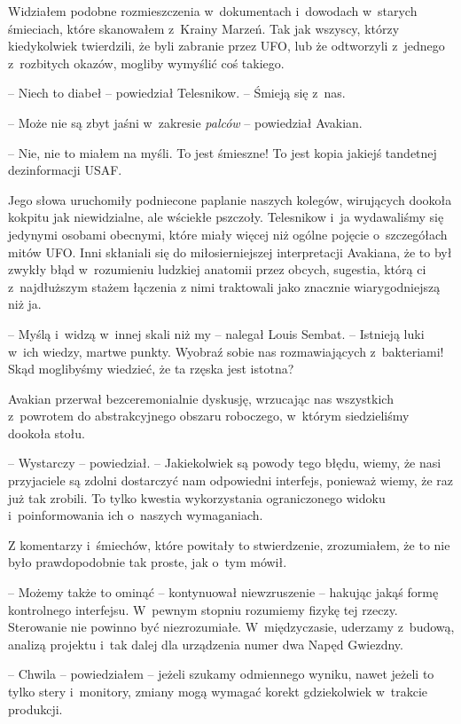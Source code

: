 \documentclass[oneside,polish,12pt,sfheadings]{mwbk}
\begin{document}
Widziałem podobne rozmieszczenia w~dokumentach i~dowodach w~starych
śmieciach, które skanowałem z~Krainy Marzeń. Tak jak wszyscy, którzy
kiedykolwiek twierdzili, że byli zabranie przez UFO, lub że odtworzyli z~jednego z~rozbitych okazów, mogliby wymyślić coś takiego.

-- Niech to diabeł -- powiedział Telesnikow. -- Śmieją się z~nas.

-- Może nie są zbyt jaśni w~zakresie \emph{palców} -- powiedział Avakian.

-- Nie, nie to miałem na myśli. To jest śmieszne! To jest kopia jakiejś
tandetnej dezinformacji USAF.

Jego słowa uruchomiły podniecone paplanie naszych kolegów, wirujących
dookoła kokpitu jak niewidzialne, ale wściekłe pszczoły. Telesnikow i~ja
wydawaliśmy się jedynymi osobami obecnymi, które miały więcej niż ogólne
pojęcie o~szczegółach mitów UFO. Inni skłaniali się do miłosierniejszej
interpretacji Avakiana, że to był zwykły błąd w~rozumieniu ludzkiej
anatomii przez obcych, sugestia, którą ci z~najdłuższym stażem łączenia
z nimi traktowali jako znacznie wiarygodniejszą niż ja.

-- Myślą i~widzą w~innej skali niż my -- nalegał Louis Sembat. -- Istnieją
luki w~ich wiedzy, martwe punkty. Wyobraź sobie nas rozmawiających z~bakteriami! Skąd moglibyśmy wiedzieć, że ta rzęska jest istotna?

Avakian przerwał bezceremonialnie dyskusję, wrzucając nas wszystkich z~powrotem do abstrakcyjnego obszaru roboczego, w~którym siedzieliśmy
dookoła stołu.

-- Wystarczy -- powiedział. -- Jakiekolwiek są powody tego błędu, wiemy, że
nasi przyjaciele są zdolni dostarczyć nam odpowiedni interfejs, ponieważ
wiemy, że raz już tak zrobili. To tylko kwestia wykorzystania
ograniczonego widoku i~poinformowania ich o~naszych wymaganiach.

Z komentarzy i~śmiechów, które powitały to stwierdzenie, zrozumiałem, że
to nie było prawdopodobnie tak proste, jak o~tym mówił.

-- Możemy także to ominąć -- kontynuował niewzruszenie -- hakując jakąś
formę kontrolnego interfejsu. W~pewnym stopniu rozumiemy fizykę tej
rzeczy. Sterowanie nie powinno być niezrozumiałe. W~międzyczasie,
uderzamy z~budową, analizą projektu i~tak dalej dla urządzenia numer dwa Napęd Gwiezdny.

-- Chwila -- powiedziałem -- jeżeli szukamy odmiennego wyniku, nawet jeżeli
to tylko stery i~monitory, zmiany mogą wymagać korekt gdziekolwiek w~trakcie produkcji.
\end{document}
